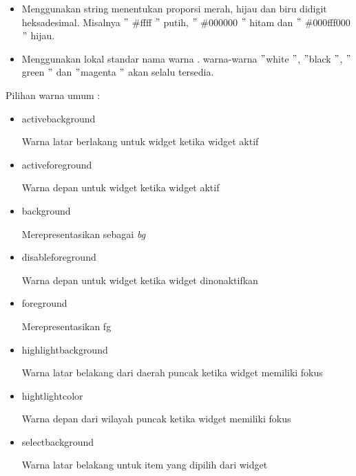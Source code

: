 \documentclass{wileySix}
\begin{document}
\begin{myEnumerate}
{\begin{myEnumerate}
	\noindent 
	\begin{itemize}
		\item Menggunakan string menentukan proporsi merah, hijau dan biru didigit heksadesimal. Misalnya  $ " $ $  \#  $ffff $ " $ putih,  $ " $ $  \#  $000000 $ " $ hitam dan  $ " $ $  \#  $000fff000 $ " $ hijau. \par
		\noindent 
		\item Menggunakan lokal standar nama warna . warna-warna  $ " $white $ " $, $ " $black $ " $,  $ " $green $ " $ dan  $ " $magenta $ " $ akan selalu tersedia.\end{itemize}
	\par
	\vspace{12pt}
	Pilihan warna umum : \par
	\noindent 
	\begin{itemize}
		\item activebackground \par
		Warna latar berlakang untuk widget ketika widget aktif \par
		\noindent 
		\item activeforeground \par
		Warna depan untuk widget ketika widget aktif \par
		\noindent 
		\item background \par
		Merepresentasikan sebagai \textit{bg} \par
		\noindent 
		\item disableforeground \par
		Warna depan untuk widget ketika widget dinonaktifkan \par
		\noindent 
		\item foreground \par
		Merepresentasikan fg \par
		\noindent 
		\item highlightbackground \par
		Warna latar belakang dari daerah puncak ketika widget memiliki fokus \par
		\noindent 
		\item hightlightcolor \par
		Warna depan dari wilayah puncak ketika widget memiliki fokus \par
		\noindent 
		\item selectbackground \par
		Warna latar belakang untuk item yang dipilih dari widget \par

\end{itemize}
\end{myEnumerate}}
\end{myEnumerate}
\end{document}
